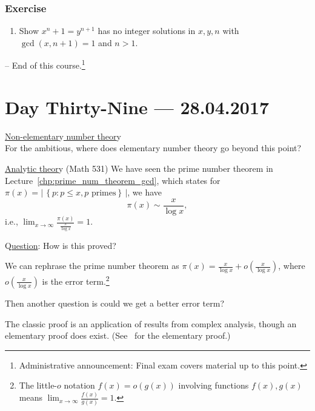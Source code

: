 \documentclass{amsbook}
\theoremstyle{plain}
\theoremstyle{definition}
\theoremstyle{remark}
\numberwithin{equation}{chapter}
\numberwithin{figure}{chapter}
\begin{document}
\subsection*{Exercise}
\begin{enumerate}
\item Show $x^n + 1 = y^{n+1}$ has no integer solutions in $x, y, n$ with $\gcd (x, n+1) = 1$ and $n > 1$.
\end{enumerate}
  
  
  
-- End of this course.\footnote{Administrative announcement: Final exam covers material up to this point.}

\chapter[Lecture Thirty-Nine]{Day Thirty-Nine \hfill {\footnotesize \rm --- 28.04.2017}}

\underline{Non-elementar}y\underline{ number theor}y\\

For the ambitious, where does elementary number theory go beyond this point?

\underline{Anal}y\underline{tic theor}y (Math 531)
We have seen the prime number theorem in Lecture~\ref{chp:prime_num_theorem_gcd}, which states for $\pi (x) = \left| \, \left\{ p : p \leqslant x, p \text{ primes} \right\}\, \right|$, we have 
\[
\pi (x) \sim \frac{x}{\log x},
\]
i.e., $\displaystyle \lim_{x \to \infty} \frac{\pi (x)}{\frac{x}{\log x}} = 1$.

Q\underline{uestion}: How is this proved?

We can rephrase the prime number theorem as $\pi (x) = \frac{x}{\log x} + o\left( \frac{x}{\log x} \right)$, where $o\left( \frac{x}{\log x} \right)$ is the error term.\footnote{The little-$o$ notation $f(x) = o(g(x))$ involving functions $f(x), g(x)$ means $\displaystyle \lim_{x \to \infty} \frac{f(x)}{g(x)} = 1$.}

Then another question is could we get a better error term?

The classic proof is an application of results from complex analysis, though an elementary proof does exist. (See~\cite{Selberg1949} for the elementary proof.) 
\end{document}
